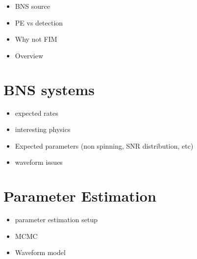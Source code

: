 \documentclass{emulateapj}
\begin{document}
 
\begin{itemize}
 \item BNS source
\item PE vs detection
\item Why not FIM
\item Overview
\end{itemize}

\section{BNS systems}
\label{BNSsection}
\begin{itemize}
\item expected rates
\item interesting physics
\item Expected parameters (non spinning, SNR distribution, etc)
\item waveform issues
\end{itemize}

\section{Parameter Estimation}
\label{PEsection}

\begin{itemize}
\item parameter estimation setup
\item MCMC
\item Waveform model
\end{itemize}
\label{peSection}
\end{document}
